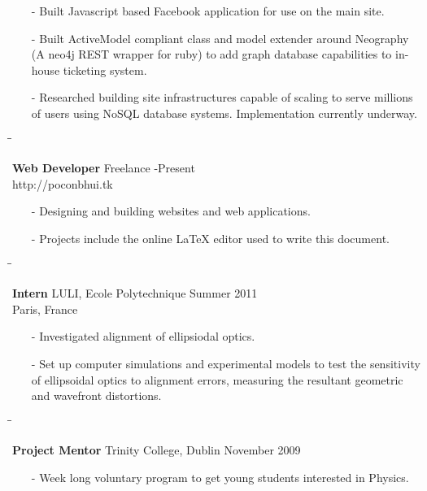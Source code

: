 \documentclass{res}
\newenvironment{employmentTitle}
{
        \begin{tabbing}
        \hspace{2.3in}\= \hspace{2.6in}\= \kill
}
{
        \end{tabbing}
        \vspace{-0.5\baselineskip}
}
\begin{document}
\begin{resume}
\begin{itemize}
\item[-] Built Javascript based Facebook application for use on the main site.

\item[-] Built ActiveModel compliant class and model extender around Neography (A neo4j REST wrapper for ruby) to add graph database capabilities to in-house ticketing system.

\item[-] Researched building site infrastructures capable of scaling to serve millions of users using NoSQL database systems. Implementation currently underway.
\end{itemize}


\begin{employmentTitle}
{\bf Web Developer}
\>Freelance
-Present\\
\>http://poconbhui.tk
\end{employmentTitle}

\begin{itemize}
\item[-] Designing and building websites and web applications.

\item[-] Projects include the online \LaTeX{} editor used to write this document.
\end{itemize}


\begin{employmentTitle}
{\bf Intern}
\>LULI, Ecole Polytechnique
\>Summer 2011\\
\>Paris, France
\end{employmentTitle}

\begin{itemize}
\item[-] Investigated alignment of ellipsiodal optics.

\item[-] Set up computer simulations and experimental models to test the sensitivity of ellipsoidal optics to
alignment errors, measuring the resultant geometric and wavefront distortions.
\end{itemize}


\begin{employmentTitle}
{\bf Project Mentor}
\>Trinity College, Dublin
\>November 2009
\end{employmentTitle}

\begin{itemize}
\item[-] Week long voluntary program to get young students interested in Physics.


\end{itemize}
\end{resume}
\end{document}
